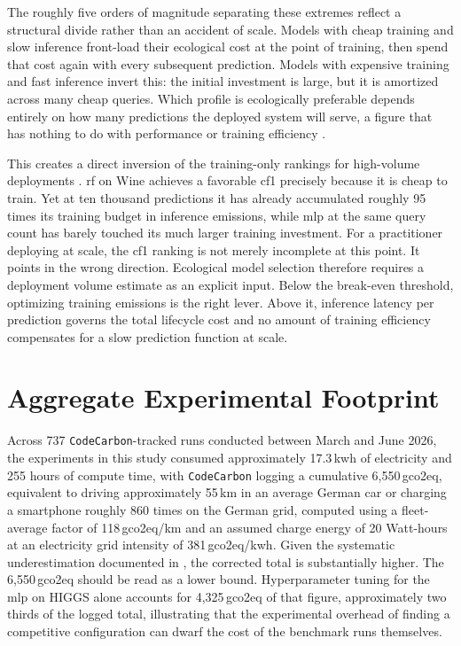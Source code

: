 The roughly five orders of magnitude separating these extremes reflect a structural divide rather than an accident of scale. Models with cheap training and slow inference front-load their ecological cost at the point of training, then spend that cost again with every subsequent prediction. Models with expensive training and fast inference invert this: the initial investment is large, but it is amortized across many cheap queries. Which profile is ecologically preferable depends entirely on how many predictions the deployed system will serve, a figure that has nothing to do with performance or training efficiency \parencite{luccioniPowerHungryProcessing2024}.

This creates a direct inversion of the training-only rankings for high-volume deployments \parencite{desislavovTrendsAIInference2023}. \gls{rf} on Wine achieves a favorable \gls{cf1} precisely because it is cheap to train. Yet at ten thousand predictions it has already accumulated roughly 95 times its training budget in inference emissions, while \gls{mlp} at the same query count has barely touched its much larger training investment. For a practitioner deploying at scale, the \gls{cf1} ranking is not merely incomplete at this point. It points in the wrong direction. Ecological model selection therefore requires a deployment volume estimate as an explicit input. Below the break-even threshold, optimizing training emissions is the right lever. Above it, inference latency per prediction governs the total lifecycle cost and no amount of training efficiency compensates for a slow prediction function at scale.

\section{Aggregate Experimental Footprint}
\label{sec:results_scope}

Across 737 \texttt{CodeCarbon}-tracked runs conducted between March and June 2026, the experiments in this study consumed approximately 17.3\,\gls{kwh} of electricity and 255 hours of compute time, with \texttt{CodeCarbon} logging a cumulative 6{,}550\,\gls{gco2eq}, equivalent to driving approximately 55\,km in an average German car or charging a smartphone roughly 860 times on the German grid, computed using a fleet-average factor of 118\,\gls{gco2eq}/km \parencite{europeanenvironmentagencyMonitoringCO2Emissions2025} and an assumed charge energy of 20 Watt-hours at an electricity grid intensity of 381\,\gls{gco2eq}/\gls{kwh}. Given the systematic underestimation documented in , the corrected total is substantially higher. The 6{,}550\,\gls{gco2eq} should be read as a lower bound. Hyperparameter tuning for the \gls{mlp} on HIGGS alone accounts for 4{,}325\,\gls{gco2eq} of that figure, approximately two thirds of the logged total, illustrating that the experimental overhead of finding a competitive configuration can dwarf the cost of the benchmark runs themselves.

